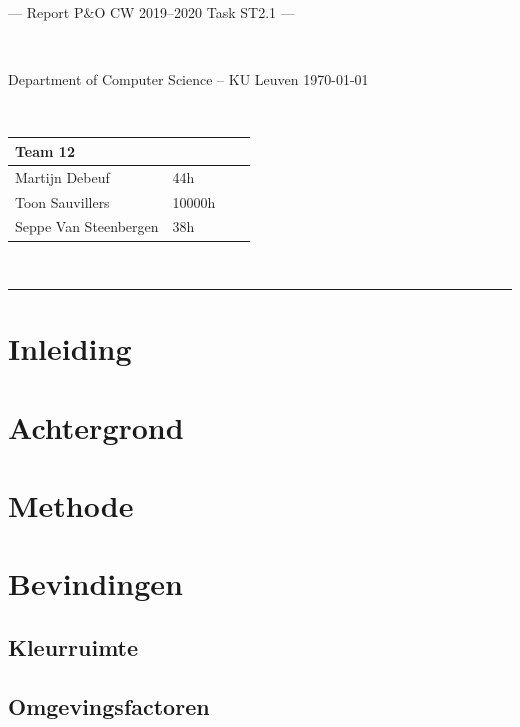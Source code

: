 \documentclass[a4paper,11pt]{article}
\begin{document}
\noindent
\colorbox[HTML]{52BDEC}{\bfseries\parbox{\textwidth}{\centering\large
  --- Report P\&O CW 2019--2020 Task ST2.1 ---
}}
\\[-1mm]
\colorbox[HTML]{00407A}{\bfseries\color{white}\parbox{\textwidth}{
  Department of Computer Science -- KU Leuven
  \hfill
  \today
}}
\\

\smallskip

\noindent
\begin{tabular}{*4l}
\toprule
\multicolumn{2}{l}{\large\textbf{Team 12}} \\
\midrule
Martijn Debeuf &  44h\\ %
Toon Sauvillers &  10000h\\
Seppe Van Steenbergen & 38h\\
\bottomrule
\hline
\end{tabular}\\

\noindent
{\color[HTML]{52BDEC} \rule{\linewidth}{1mm} }

\tableofcontents
\newpage
\section{Inleiding}\label{sec:inleiding}
	

\section{Achtergrond}\label{sec:achtergrond}
	

\section{Methode}\label{sec:methode}
	

\section{Bevindingen}\label{sec:bevindingen}
	

	\subsection{Kleurruimte}\label{subsec:kleurruimte}
		
	\subsection{Omgevingsfactoren}\label{subsec:omgevingsfactoren}
		
	
\end{document}
